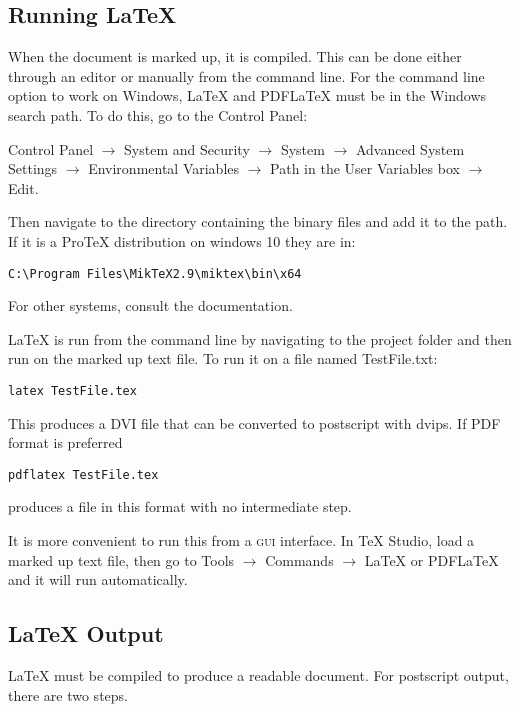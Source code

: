 \documentclass[a4paper]{article}
\begin{document}
\subsection{Running LaTeX}

When the document is marked up, it is compiled. This can be done either through an editor or manually from the command line. For the command line option to work on Windows, LaTeX and PDFLaTeX must be in the Windows search path. To do this, go to the Control Panel:

Control Panel $\rightarrow$ System and Security $\rightarrow$ System $\rightarrow$ Advanced System Settings $\rightarrow$ Environmental Variables $\rightarrow$ Path in the User Variables box $\rightarrow$ Edit.

Then navigate to the directory containing the binary files and add it to the path. If it is a ProTeX distribution on windows 10 they are in: 

\begin{verbatim}
C:\Program Files\MikTeX2.9\miktex\bin\x64
\end{verbatim}

For other systems, consult the documentation.


LaTeX is run from the command line by navigating to the project folder and then run on the marked up text file. To run it on a file named TestFile.txt: 

\begin{verbatim}
latex TestFile.tex
\end{verbatim}

This produces a DVI file that can be converted to postscript with dvips. If PDF format is preferred

\begin{verbatim}
pdflatex TestFile.tex
\end{verbatim}

produces a file in this format with no intermediate step.

It is more convenient to run this from a \textsc{gui} interface. In TeX Studio, load a marked up text file, then go to Tools $\rightarrow$ Commands $\rightarrow$ LaTeX or PDFLaTeX and it will run automatically.




\subsection{LaTeX Output}

LaTeX must be compiled to produce a readable document. For postscript output, there are two steps.
\end{document}
